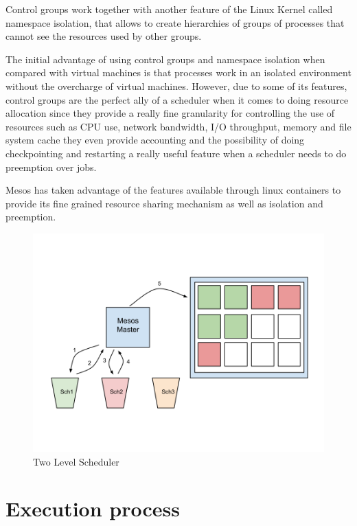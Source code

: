 \documentclass{report}                     %
\begin{document}
Control groups work together with another feature of the Linux Kernel
called namespace isolation, that allows to create hierarchies of
groups of processes that cannot see the resources used by other
groups.

The initial advantage of using control groups and namespace isolation when
compared with virtual machines is that processes work in an isolated
environment without the overcharge of virtual machines. However, due
to some of its features, control groups are the perfect ally of a
scheduler when it comes to doing resource allocation since they provide
a really fine granularity for controlling the use of resources such
as CPU use, network bandwidth, I/O throughput, memory and file system 
cache they even provide accounting and the possibility of doing
checkpointing and restarting a really useful feature when a scheduler
needs to do preemption over jobs.

Mesos has taken advantage of the features available through linux containers
\cite{_linux_????} to provide its fine grained resource sharing
mechanism as well as isolation and preemption.

\begin{figure}[!ht]
  \centering
  \includegraphics[scale=0.25,natwidth=960,natheight=720]{TwoLevel.png}
  \caption{Two Level Scheduler}
  \label{fig:two_level}
\end{figure}


\section{Execution process}
\end{document}
